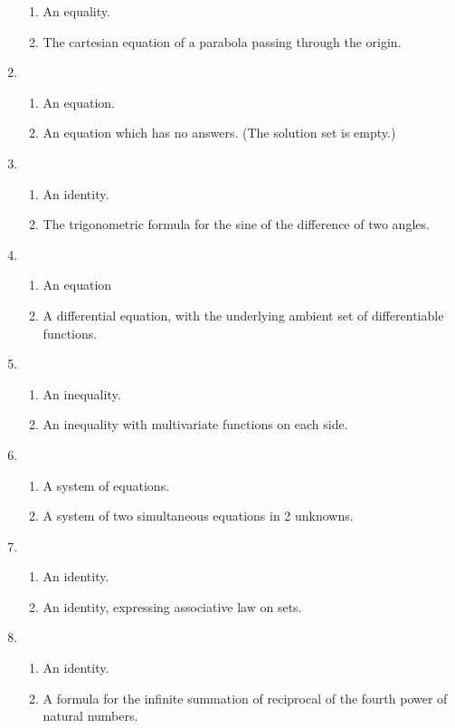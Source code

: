 \documentclass{article}
\begin{document}
\begin{enumerate}
		\begin{enumerate}[label=\roman*]
			\item  An equality.
			\item The cartesian equation of a parabola passing through the origin.
		\end{enumerate}
		\item
		\begin{enumerate}[label=\roman*]
			\item  An equation.
			\item  An equation which has no answers. (The solution set is empty.)
		\end{enumerate}
		\item
		\begin{enumerate}[label=\roman*]
			\item  An identity.
			\item The trigonometric formula for the sine of the difference of two angles.
		\end{enumerate}
		\item 
		\begin{enumerate}[label=\roman*]
			\item  An equation
			\item A differential equation, with the underlying ambient set of differentiable functions.
		\end{enumerate}
		\item
		\begin{enumerate}[label=\roman*]
			\item  An inequality.
			\item  An inequality with multivariate functions on each side.
		\end{enumerate}
		\item
		\begin{enumerate}[label=\roman*]
			\item  A system of equations.
			\item  A system of two simultaneous equations in 2 unknowns.
		\end{enumerate}
		\item
		\begin{enumerate}[label=\roman*]
			\item  An identity.
			\item  An identity, expressing associative law on sets.
		\end{enumerate}		
			\item
		\begin{enumerate}[label=\roman*]
			\item  An identity.
			\item  A formula for the infinite summation of reciprocal of the fourth power of natural numbers.
		\end{enumerate}		
	\end{enumerate}
	
\end{document}
